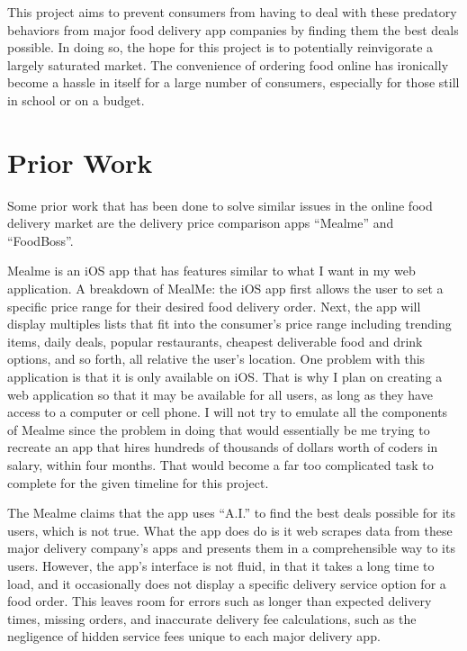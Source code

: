\documentclass[10pt,twocolumn]{article}
\begin{document}
This project aims to prevent consumers from having to deal with these predatory behaviors from major food delivery app companies by finding them the best deals possible. In doing so, the hope for this project is to potentially reinvigorate a largely saturated market. The convenience of ordering food online has ironically become a hassle in itself for a large number of consumers, especially for those still in school or on a budget. 

\section{Prior Work}

Some prior work that has been done to solve similar issues in the online food delivery market are the delivery price comparison apps “Mealme”  and “FoodBoss”.

Mealme is an iOS app that has features similar to what I want in my web application. A breakdown of MealMe: the iOS app first allows the user to set a specific price range for their desired food delivery order. Next, the app will display multiples lists that fit into the consumer's price range including trending items, daily deals, popular restaurants, cheapest deliverable food and drink options, and so forth, all relative the user's location. One problem with this application is that it is only available on iOS. That is why I plan on creating a web application so that it may be available for all users, as long as they have access to a computer or cell phone. I will not try to emulate all the components of Mealme since the problem in doing that would essentially be me trying to recreate an app that hires hundreds of thousands of dollars worth of coders in salary, within four months. That would become a far too complicated task to complete for the given timeline for this project.

The Mealme claims that the app uses “A.I.” to find the best deals possible for its users, which is not true. What the app does do is it web scrapes data from these major delivery company's apps and presents them in a comprehensible way to its users. However, the app’s interface is not fluid, in that it takes a long time to load, and it occasionally does not display a specific delivery service option for a food order. This leaves room for errors such as longer than expected delivery times, missing orders, and inaccurate delivery fee calculations, such as the negligence of hidden service fees unique to each major delivery app.
\end{document}
